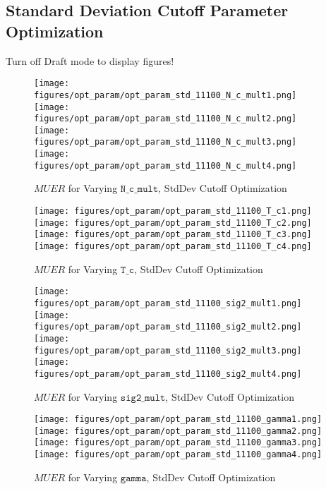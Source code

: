 	\fi




\subsection{Standard Deviation Cutoff Parameter Optimization}
	\label{Standard Deviation Cutoff Parameter Optimization}

	\ifdraft
	Turn off Draft mode to display figures!
	\else

	\begin{figure}[H]
	\texttt{[image: figures/opt\_param/opt\_param\_std\_11100\_N\_c\_mult1.png]}%
	\texttt{[image: figures/opt\_param/opt\_param\_std\_11100\_N\_c\_mult2.png]}%
	\texttt{[image: figures/opt\_param/opt\_param\_std\_11100\_N\_c\_mult3.png]}%
	\texttt{[image: figures/opt\_param/opt\_param\_std\_11100\_N\_c\_mult4.png]}%
	\caption{$MUER$ for Varying $\mathtt{N\_c\_mult}$, StdDev Cutoff Optimization}
	\end{figure}

	\begin{figure}[H]
	\texttt{[image: figures/opt\_param/opt\_param\_std\_11100\_T\_c1.png]}%
	\texttt{[image: figures/opt\_param/opt\_param\_std\_11100\_T\_c2.png]}%
	\texttt{[image: figures/opt\_param/opt\_param\_std\_11100\_T\_c3.png]}%
	\texttt{[image: figures/opt\_param/opt\_param\_std\_11100\_T\_c4.png]}%
	\caption{$MUER$ for Varying $\mathtt{T\_c}$, StdDev Cutoff Optimization}
	\end{figure}

	\begin{figure}[H]
	\texttt{[image: figures/opt\_param/opt\_param\_std\_11100\_sig2\_mult1.png]}%
	\texttt{[image: figures/opt\_param/opt\_param\_std\_11100\_sig2\_mult2.png]}%
	\texttt{[image: figures/opt\_param/opt\_param\_std\_11100\_sig2\_mult3.png]}%
	\texttt{[image: figures/opt\_param/opt\_param\_std\_11100\_sig2\_mult4.png]}%
	\caption{$MUER$ for Varying $\mathtt{sig2\_mult}$, StdDev Cutoff Optimization}
	\end{figure}

	\begin{figure}[H]
	\texttt{[image: figures/opt\_param/opt\_param\_std\_11100\_gamma1.png]}%
	\texttt{[image: figures/opt\_param/opt\_param\_std\_11100\_gamma2.png]}%
	\texttt{[image: figures/opt\_param/opt\_param\_std\_11100\_gamma3.png]}%
	\texttt{[image: figures/opt\_param/opt\_param\_std\_11100\_gamma4.png]}%
	\caption{$MUER$ for Varying $\mathtt{gamma}$, StdDev Cutoff Optimization}
	\end{figure}

